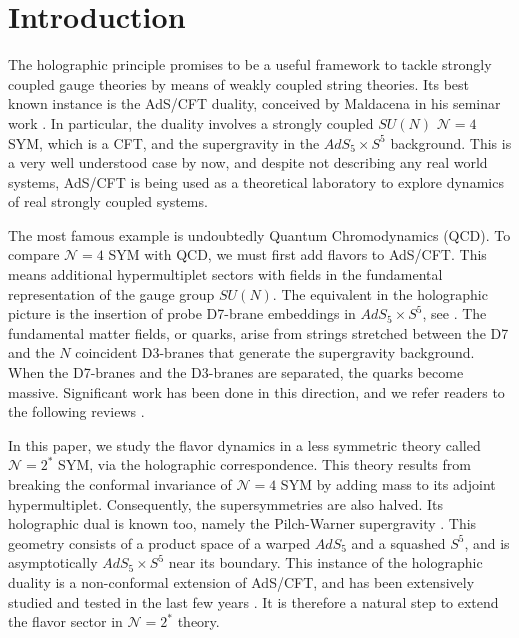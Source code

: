 \section{Introduction}

The holographic principle promises to be a useful framework to tackle strongly coupled gauge theories by means of weakly coupled string theories. Its best known instance is the AdS/CFT duality, conceived by Maldacena in his seminar work \cite{Maldacena:1997re}. In particular, the duality involves a strongly coupled $SU(N)$ $\mathcal{N}=4$ SYM, which is a CFT, and the supergravity in the $AdS_5 \times S^5$ background. This is a very well understood case by now, and despite not describing any real world systems, AdS/CFT is being used as a theoretical laboratory to explore dynamics of real strongly coupled systems.

The most famous example is undoubtedly Quantum Chromodynamics (QCD). To compare $\mathcal{N}=4$ SYM with QCD, we must first add flavors to AdS/CFT. This means additional hypermultiplet sectors with fields in the fundamental representation of the gauge group $SU(N)$. The equivalent in the holographic picture is the insertion of probe D7-brane embeddings in $AdS_5 \times S^5$, see \cite{Karch:2002sh}. The fundamental matter fields, or quarks, arise from strings stretched between the D7 and the $N$ coincident D3-branes that generate the supergravity background. When the D7-branes and the D3-branes are separated, the quarks become massive. Significant work has been done in this direction, and we refer readers to the following reviews \cite{CasalderreySolana:2011us, Erdmenger:2007cm}.

In this paper, we study the flavor dynamics in a less symmetric theory called $\mathcal{N}=2^*$ SYM, via the holographic correspondence. This theory results from breaking the conformal invariance of $\mathcal{N}=4$ SYM by adding mass to its adjoint hypermultiplet. Consequently, the supersymmetries are also halved. Its holographic dual is known too, namely the Pilch-Warner supergravity \cite{Pilch:2000ue, Pilch:2003jg}. This geometry consists of a product space of a warped $AdS_5$ and a squashed $S^5$, and is asymptotically $AdS_5 \times S^5$ near its boundary. This instance of the holographic duality is a non-conformal extension of AdS/CFT, and has been extensively studied and tested in the last few years \cite{Buchel:2013id, Chen-Lin:2015xlh, Chen-Lin:2017pay, Russo:2019lgq}. It is therefore a natural step to extend the flavor sector in $\mathcal{N}=2^*$ theory. 

